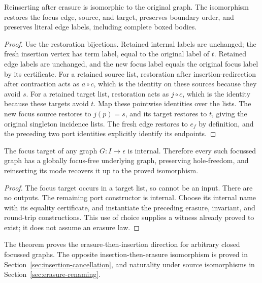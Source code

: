 \begin{theorem}
Reinserting after erasure is isomorphic to the original graph. The isomorphism
restores the focus edge, source, and target, preserves boundary order, and
preserves literal edge labels, including complete boxed bodies.
\end{theorem}
\begin{proof}
Use the restoration bijections. Retained internal labels are unchanged; the
fresh insertion vertex has term label, equal to the original label of $t$.
Retained edge labels are unchanged, and the new focus label equals the original
focus label by its certificate.
For a retained source list, restoration after insertion-redirection after
contraction acts as $a\circ c$, which is the identity on these sources because
they avoid $s$. For a retained target list, restoration acts as $j\circ c$,
which is the identity because these targets avoid $t$. Map these pointwise
identities over the lists. The new focus source restores to $j(p)=s$, and its
target restores to $t$, giving the original singleton incidence lists.
The fresh edge restores to $e_f$ by definition, and the preceding two port
identities explicitly identify its endpoints.
\end{proof}

\begin{lemma}
The focus target of any graph $G:I\to\epsilon$ is internal. Therefore every
such focussed graph has a globally focus-free underlying graph, preserving
hole-freedom, and reinserting its mode recovers it up to the proved isomorphism.
\end{lemma}
\begin{proof}
The focus target occurs in a target list, so cannot be an input. There are no
outputs. The remaining port constructor is internal. Choose its internal name
with its equality certificate, and instantiate the preceding erasure,
invariant, and round-trip constructions. This use of choice supplies a witness
already proved to exist; it does not assume an erasure law.
\end{proof}
The theorem proves the erasure-then-insertion direction for arbitrary closed
focussed graphs. The opposite insertion-then-erasure isomorphism is proved in
Section~\ref{sec:insertion-cancellation}, and naturality under source
isomorphisms in Section~\ref{sec:erasure-renaming}.

